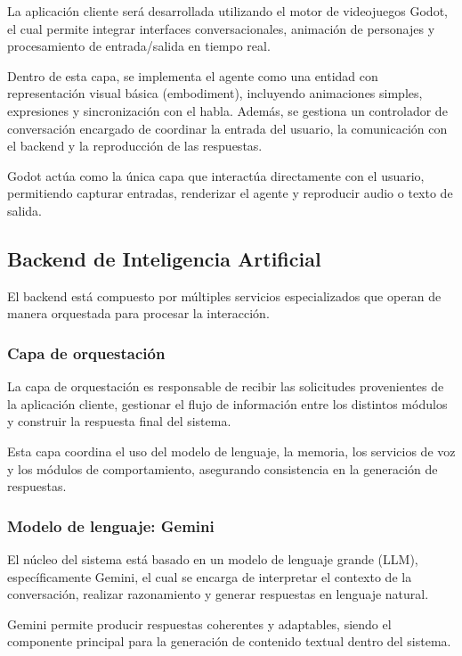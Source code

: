 \documentclass[12pt]{article}
\begin{document}
La aplicación cliente será desarrollada utilizando el motor de videojuegos Godot, el cual permite integrar interfaces conversacionales, animación de personajes y procesamiento de entrada/salida en tiempo real.

Dentro de esta capa, se implementa el agente como una entidad con representación visual básica (embodiment), incluyendo animaciones simples, expresiones y sincronización con el habla. Además, se gestiona un controlador de conversación encargado de coordinar la entrada del usuario, la comunicación con el backend y la reproducción de las respuestas.

Godot actúa como la única capa que interactúa directamente con el usuario, permitiendo capturar entradas, renderizar el agente y reproducir audio o texto de salida.

\subsection{Backend de Inteligencia Artificial}

El backend está compuesto por múltiples servicios especializados que operan de manera orquestada para procesar la interacción.

\subsubsection{Capa de orquestación}

La capa de orquestación es responsable de recibir las solicitudes provenientes de la aplicación cliente, gestionar el flujo de información entre los distintos módulos y construir la respuesta final del sistema.

Esta capa coordina el uso del modelo de lenguaje, la memoria, los servicios de voz y los módulos de comportamiento, asegurando consistencia en la generación de respuestas.

\subsubsection{Modelo de lenguaje: Gemini}

El núcleo del sistema está basado en un modelo de lenguaje grande (LLM), específicamente Gemini, el cual se encarga de interpretar el contexto de la conversación, realizar razonamiento y generar respuestas en lenguaje natural.

Gemini permite producir respuestas coherentes y adaptables, siendo el componente principal para la generación de contenido textual dentro del sistema.
\end{document}
